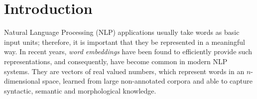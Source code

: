 \section{Introduction}


Natural Language Processing (NLP) applications usually take words as basic input units; therefore, it is important that they be represented in a meaningful way.
In recent years, \emph{word embeddings} have been found to efficiently provide such representations, and consequently, have become common in modern NLP systems. They are vectors of real valued numbers, which represent words in an $n$-dimensional space, learned from large non-annotated corpora and able to capture syntactic, semantic and morphological knowledge.




